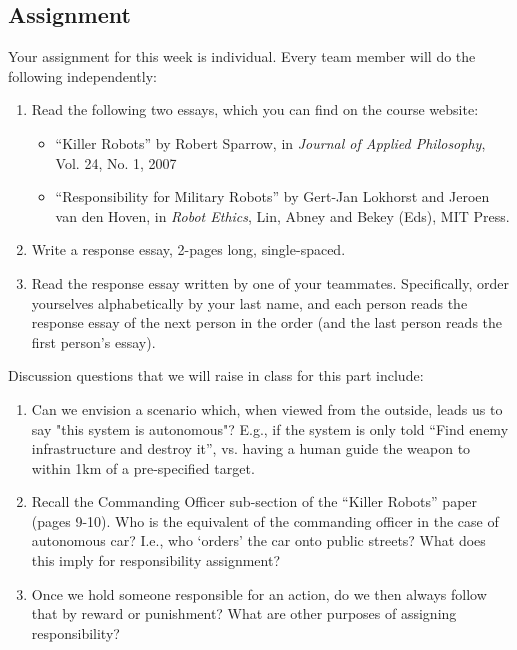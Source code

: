\documentclass[letta4 paper]{article}
\numberwithin{equation}{section}
\newcommand{\0}{\mathbf{0}}
\begin{document}
	\subsection{Assignment}
	Your assignment for this week is individual. 
	Every team member will do the following independently: 
	\begin{enumerate}
		\item Read the following two essays, which you can find on the course website:
		\begin{itemize}
			\item ``Killer Robots'' by Robert Sparrow, in \textit{Journal of Applied Philosophy}, Vol. 24, No. 1, 2007
			\item ``Responsibility for Military Robots'' by Gert-Jan Lokhorst and Jeroen van den Hoven, in \textit{Robot Ethics}, Lin, Abney and Bekey (Eds), MIT Press.
		\end{itemize}
		
		\item Write a response essay, 2-pages long, single-spaced. 
		
		\item Read the response essay written by one of your teammates. Specifically, order yourselves alphabetically by your last name, and each person reads the response essay of the next person in the order (and the last person reads the first person's essay).
	\end{enumerate}
	
	Discussion questions that we will raise in class for this part include:
	\begin{enumerate}
		\item Can we envision a scenario which, when viewed from the outside, leads us to say "this system is autonomous"? E.g., if the system is only told ``Find enemy infrastructure and destroy it'', vs. having a human guide the weapon to within 1km of a pre-specified target.
		\item Recall the Commanding Officer sub-section of the ``Killer Robots'' paper (pages 9-10). Who is the equivalent of the commanding officer in the case of autonomous car? I.e., who `orders' the car onto public streets? What does this imply for responsibility assignment?
		\item Once we hold someone responsible for an action, do we then always follow that by reward or punishment? What are other purposes of assigning responsibility?
	\end{enumerate}
	
\end{document}
